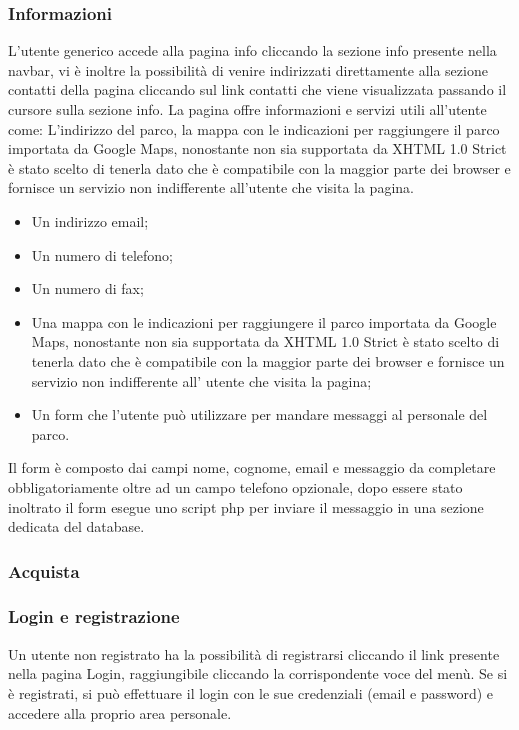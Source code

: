             \subsubsection{Informazioni}
            L’utente generico accede alla pagina info cliccando la sezione info presente nella navbar, vi è inoltre la possibilità di venire indirizzati direttamente alla sezione contatti della pagina cliccando sul link contatti che viene visualizzata passando il cursore sulla sezione info. La pagina offre informazioni e servizi utili all’utente come:
            L’indirizzo del parco, la mappa con le indicazioni per raggiungere il parco importata da Google Maps, nonostante non sia supportata da XHTML 1.0 Strict è stato scelto di tenerla dato che è compatibile con la maggior parte dei browser e fornisce un servizio non indifferente all’utente che visita la pagina.
            \begin{itemize}
                \item Un indirizzo email;
                \item Un numero di telefono;
                \item Un numero di fax;
                \item Una mappa con le indicazioni per raggiungere il parco importata da Google Maps, nonostante non sia supportata da XHTML 1.0 Strict è stato scelto di tenerla dato che è compatibile con la maggior parte dei browser e fornisce un servizio non indifferente all’ utente che visita la pagina;
                \item Un form che l’utente può utilizzare per mandare messaggi al personale del parco.
            \end{itemize}
            Il form è composto dai campi nome, cognome, email e messaggio da completare obbligatoriamente oltre ad un campo telefono opzionale, dopo essere stato inoltrato il form esegue uno script php per inviare il messaggio in una sezione dedicata del database.

        \subsubsection{Acquista}
        \subsubsection{Login e registrazione}
            Un utente non registrato ha la possibilità di registrarsi cliccando il link presente nella pagina Login, raggiungibile cliccando la corrispondente voce del menù. Se si è registrati, si può effettuare il login con le sue credenziali (email e password) e accedere alla proprio area personale.
